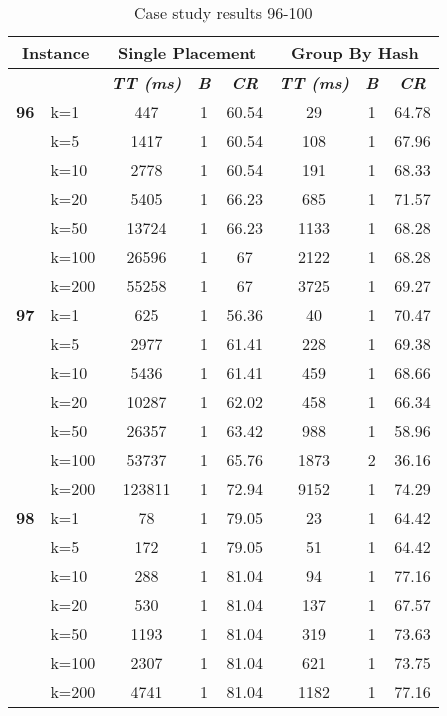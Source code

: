    \begin{table}[htbp]
    \caption{Case study results 96-100}
    \centering
    \begin{tabular}{|l|l|c|c|c|c|c|c|}
    \hline
    \multicolumn{ 2}{|c|}{\textbf{Instance}} & \multicolumn{ 3}{c|}{\textbf{Single Placement}} & \multicolumn{ 3}{c|}{\textbf{Group By Hash}} \\ \hline
    \multicolumn{ 2}{|l|}{} & \textbf{\textit{TT (ms)}} & \textbf{\textit{B}} & \textbf{\textit{CR}} & \textbf{\textit{TT (ms)}} & \textbf{\textit{B}} & \textbf{\textit{CR}} \\ \hline
    \multicolumn{1}{|r|}{\textbf{96}} & k=1 & 447 & 1 & 60.54 & 29 & 1 & 64.78 \\ 
     & k=5 & 1417 & 1 & 60.54 & 108 & 1 & 67.96 \\ 
     & k=10 & 2778 & 1 & 60.54 & 191 & 1 & 68.33 \\ 
     & k=20 & 5405 & 1 & 66.23 & 685 & 1 & 71.57 \\ 
     & k=50 & 13724 & 1 & 66.23 & 1133 & 1 & 68.28 \\ 
     & k=100 & 26596 & 1 & 67 & 2122 & 1 & 68.28 \\ 
     & k=200 & 55258 & 1 & 67 & 3725 & 1 & 69.27 \\ \hline
    \multicolumn{1}{|r|}{\textbf{97}} & k=1 & 625 & 1 & 56.36 & 40 & 1 & 70.47 \\ 
     & k=5 & 2977 & 1 & 61.41 & 228 & 1 & 69.38 \\ 
     & k=10 & 5436 & 1 & 61.41 & 459 & 1 & 68.66 \\ 
     & k=20 & 10287 & 1 & 62.02 & 458 & 1 & 66.34 \\ 
     & k=50 & 26357 & 1 & 63.42 & 988 & 1 & 58.96 \\ 
     & k=100 & 53737 & 1 & 65.76 & 1873 & 2 & 36.16 \\ 
     & k=200 & 123811 & 1 & 72.94 & 9152 & 1 & 74.29 \\ \hline
    \multicolumn{1}{|r|}{\textbf{98}} & k=1 & 78 & 1 & 79.05 & 23 & 1 & 64.42 \\ 
     & k=5 & 172 & 1 & 79.05 & 51 & 1 & 64.42 \\ 
     & k=10 & 288 & 1 & 81.04 & 94 & 1 & 77.16 \\ 
     & k=20 & 530 & 1 & 81.04 & 137 & 1 & 67.57 \\ 
     & k=50 & 1193 & 1 & 81.04 & 319 & 1 & 73.63 \\ 
     & k=100 & 2307 & 1 & 81.04 & 621 & 1 & 73.75 \\ 
     & k=200 & 4741 & 1 & 81.04 & 1182 & 1 & 77.16 \\ \hline

\end{tabular}
\end{table}
